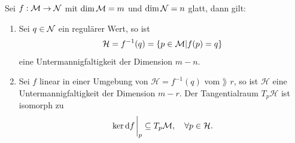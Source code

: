 \begin{kor}
Sei $f: \mathcal{M} \to \mathcal{N}$ mit $\dim \mathcal{M} = m$ und $\dim \mathcal{N} = n$ glatt, dann gilt:
\begin{enumerate}
\item Sei $q \in \mathcal{N}$ ein regulärer Wert, so ist 
\begin{align}
\mathcal{H} = f^{-1}(q) = \{ p \in \mathcal{M} \vert f(p) = q \}
\end{align}
eine Untermannigfaltigkeit der Dimension $m-n$.
\item Sei $f$ linear in einer Umgebung von $\mathcal{H} = f^{-1}(q)$ vom $\rang$ $r$, so ist $\mathcal{H}$ eine Untermannigfaltigkeit der Dimension $m-r$.
Der Tangentialraum $T_p \mathcal{H}$ ist isomorph zu
\begin{align}
\ker \dd f \eval_p \subseteq \tspace{p}, \quad \forall p \in \mathcal{H}.
\end{align}
\end{enumerate} 
\end{kor}
